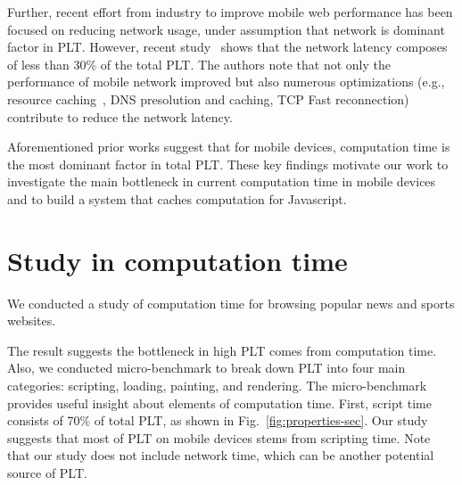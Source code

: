 Further, recent effort from industry to improve mobile web performance
has been focused on reducing network usage, under assumption that
network is dominant factor in PLT. However, recent
study~\cite{njait2016www} shows that the network latency composes of
less than 30\% of the total PLT. The authors note that not only the
performance of mobile network improved but also numerous
optimizations (e.g., resource caching~\cite{vesuna2016caching}, DNS
presolution and caching, TCP Fast reconnection) contribute to reduce
the network latency.

Aforementioned prior works suggest that for mobile devices,
computation time is the most dominant factor in total PLT.  These key
findings motivate our work to investigate the main bottleneck in
current computation time in mobile devices and to build a system that
caches computation for Javascript.

\section{Study in computation time}


We conducted a study of computation time for browsing popular news and
sports websites. 

The result suggests the bottleneck in high PLT comes from computation
time. Also, we conducted micro-benchmark to break
down PLT into four main categories: scripting, loading, painting, and
rendering. The micro-benchmark provides useful insight about elements
of computation time. First, script time consists of 70\% of total PLT,
as shown in Fig.~\ref{fig:properties-sec}. Our study suggests that
most of PLT on mobile devices stems from scripting time. Note that our
study does not include network time, which can be another potential
source of PLT.


